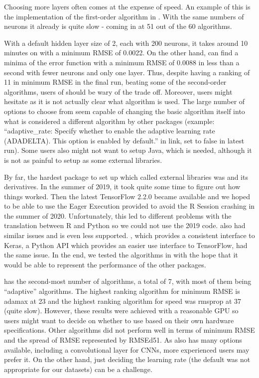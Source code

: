 Choosing more layers often comes at the expense of speed. An example of
this is the implementation of the first-order algorithm in 
\citep{R-h2o}. With the same numbers of neurons it already is quite slow
- coming in at 51 out of the 60 algorithms.

With a default hidden layer size of 2, each with 200 neurons, it takes
around 10 minutes on  with a minimum RMSE of 0.0022. On
the other hand,  can find a minima of the error function
with a minimum RMSE of 0.0088 in less than a second with fewer neurons
and only one layer. Thus, despite having a ranking of 11 in minimum RMSE
in the final run, beating some of the second-order algorithms, users of
 should be wary of the trade off. Moreover, users might
hesitate as it is not actually clear what algorithm is used. The large
number of options to choose from seem capable of changing the basic
algorithm itself into what is considered a different algorithm by other
packages (example: ``adaptive\_rate: Specify whether to enable the
adaptive learning rate (ADADELTA). This option is enabled by default.''
in link, set to false in latest run). Some users also might not want to
setup Java, which is needed, although it is not as painful to setup as
some external libraries.

By far, the hardest package to set up which called external libraries
was  \citep{R-tensorflow} and its derivatives. In
the summer of 2019, it took quite some time to figure out how things
worked. Then the latest \textsf{TensorFlow} 2.2.0 became available and
we hoped to be able to use the Eager Execution provided to avoid the
\textsf{R} Session crashing in the summer of 2020. Unfortunately, this
led to different problems with the translation between \textsf{R} and
\textsf{Python} so we could not use the 2019 code.
 \citep{R-tfestimators} also had similar issues
and is even less supported.  \citep{R-kerasR}, which
provides a consistent interface to Keras, a \textsf{Python} API which
provides an easier use interface to TensorFlow, had the same issue. In
the end, we tested the algorithms in  \citep{R-keras}
with the hope that it would be able to represent the performance of the
other packages.

 has the second-most number of algorithms, a total of 7,
with most of them being ``adaptive'' algorithms. The highest ranking
algorithm for minimum RMSE is adamax at 23 and the highest ranking
algorithm for speed was rmsprop at 37 (quite slow). However, these
results were achieved with a reasonable GPU so users might want to
decide on whether to use  based on their own hardware
specifications. Other algorithms did not perform well in terms of
minimum RMSE and the spread of RMSE represented by RMSEd51. As
 also has many options available, including a
convolutional layer for CNNs, more experienced users may prefer it. On
the other hand, just deciding the learning rate (the default was not
appropriate for our datasets) can be a challenge.


